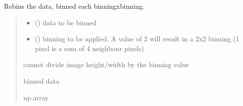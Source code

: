 \documentclass[letterpaper,10pt,english]{sphinxmanual}
\begin{document}
\begin{fulllineitems}
\label{\detokenize{micropolarray.processing:micropolarray.processing.rebin.standard_rebin}}
\pysigstartsignatures
{}
\pysigstopsignatures
\sphinxAtStartPar
Rebins the data, binned each binningxbinning.
\begin{quote}\begin{description}
\begin{itemize}
\item {} 
\sphinxAtStartPar
{} () \textendash{} data to be binned

\item {} 
\sphinxAtStartPar
{} () \textendash{} binning to be applied. A value of 2 will result in a 2x2 binning (1 pixel is a sum of 4 neighbour pixels)

\end{itemize}

\sphinxAtStartPar
{} \textendash{} cannot divide image height/width by the binning value

\sphinxAtStartPar
binned data

\sphinxAtStartPar
np.array

\end{description}\end{quote}

\end{fulllineitems}

\end{document}
